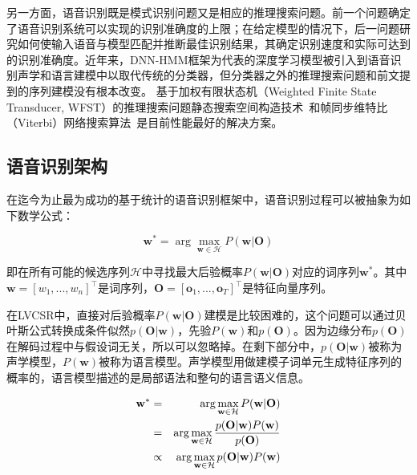 另一方面，语音识别既是模式识别问题又是相应的推理搜索问题。前一个问题确定了语音识别系统可以实现的识别准确度的上限；在给定模型的情况下，后一问题研究如何使输入语音与模型匹配并推断最佳识别结果，其确定识别速度和实际可达到的识别准确度。近年来，DNN-HMM框架为代表的深度学习模型被引入到语音识别声学和语言建模中以取代传统的分类器，但分类器之外的推理搜索问题和前文提到的序列建模没有根本改变。
基于加权有限状态机（Weighted Finite State Transducer, WFST）的推理搜索问题静态搜索空间构造技术~\cite{mohri2002weighted}和帧同步维特比（Viterbi）网络搜索算法~\cite{forney1973viterbi}是目前性能最好的解决方案。

\subsection{语音识别架构}
\label{chap:intro0-asr-framework}


在迄今为止最为成功的基于统计的语音识别框架中，语音识别过程可以被抽象为如下数学公式：

\begin{equation}
    \label{eq:asr}
    \mathbf{w}^* = \arg \max_{\mathbf{w} \in \mathcal{H}}P(\mathbf{w}|\mathbf{O})
\end{equation}

即在所有可能的候选序列$\mathcal{H}$中寻找最大后验概率$P(\mathbf{w}|\mathbf{O})$对应的词序列$\mathbf{w}^*$。其中$\mathbf{w}=\left[ w_1, ..., w_n \right]^\top$是词序列，$\mathbf{O}=\left[ \mathbf{o}_1, ..., \mathbf{o}_T \right]^\top$是特征向量序列。


在LVCSR中，直接对后验概率$P(\mathbf{w}|\mathbf{O})$建模是比较困难的，这个问题可以通过贝叶斯公式转换成条件似然$p(\mathbf{O}|\mathbf{w})$，先验$P(\mathbf{w})$和$p(\mathbf{O})$。因为边缘分布$p(\mathbf{O})$在解码过程中与假设词无关，所以可以忽略掉。在剩下部分中，$p(\mathbf{O}|\mathbf{w})$被称为声学模型，$P(\mathbf{w})$被称为语言模型。声学模型用做建模子词单元生成特征序列的概率的，语言模型描述的是局部语法和整句的语言语义信息。



\begin{eqnarray*}
    \centering
    \mathbf{w}^* &=& \arg \max_{\mathbf{w} \in \mathcal{H}}P(\mathbf{w}|\mathbf{O}) \\
    &=& \arg \max_{\mathbf{w} \in \mathcal{H}} \frac{p(\mathbf{O}|\mathbf{w})P(\mathbf{w})}{p(\mathbf{O})} \\
    &\propto& \arg \max_{\mathbf{w} \in \mathcal{H}} p(\mathbf{O}|\mathbf{w})P(\mathbf{w}) \\
\end{eqnarray*}


